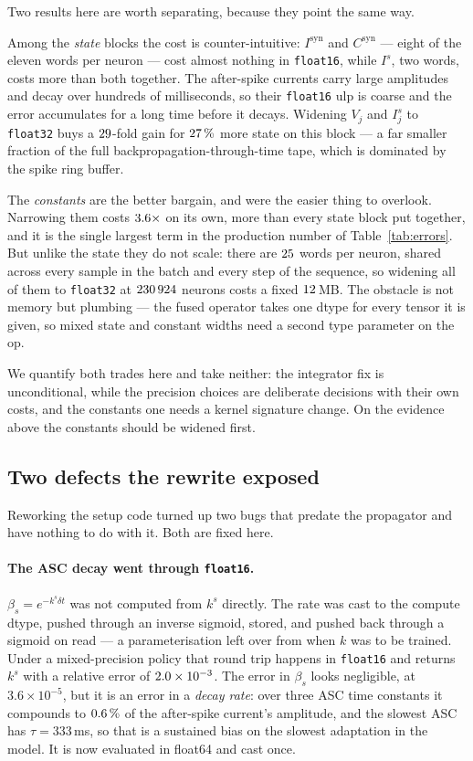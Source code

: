 \documentclass[11pt,a4paper,numbers=noenddot]{scrartcl}
\newcommand{\dt}{\delta t}
\newcommand{\Isyn}{I^{\mathrm{syn}}}
\newcommand{\Csyn}{C^{\mathrm{syn}}}
\newcommand{\code}[1]{\texttt{\small #1}}
\begin{document}
Two results here are worth separating, because they point the same way.

Among the \emph{state} blocks the cost is counter-intuitive: $\Isyn$ and
$\Csyn$ --- eight of the eleven words per neuron --- cost almost nothing in
\code{float16}, while $I^{s}$, two words, costs more than both together. The
after-spike currents carry large amplitudes and decay over hundreds of
milliseconds, so their \code{float16} ulp is coarse and the error accumulates
for a long time before it decays. Widening $V_j$ and $I^{s}_j$ to
\code{float32} buys a $29$-fold gain for $27\,\%$ more
state on this block --- a far smaller fraction of the full
backpropagation-through-time tape, which is dominated by the spike ring buffer.

The \emph{constants} are the better bargain, and were the easier thing to
overlook. Narrowing them costs $3.6\times$ on its own, more than
every state block put together, and it is the single largest term in the
production number of Table~\ref{tab:errors}. But unlike the state they do not
scale: there are $25$ words per neuron, shared across every sample
in the batch and every step of the sequence, so widening all of them to
\code{float32} at $230\,924$ neurons costs a fixed
$12\,$MB. The obstacle is not memory but plumbing --- the fused
operator takes one dtype for every tensor it is given, so mixed state and
constant widths need a second type parameter on the op.

We quantify both trades here and take neither: the integrator fix is
unconditional, while the precision choices are deliberate decisions with their
own costs, and the constants one needs a kernel signature change. On the
evidence above the constants should be widened first.

\subsection{Two defects the rewrite exposed}
\label{sec:defects}

Reworking the setup code turned up two bugs that predate the propagator and
have nothing to do with it. Both are fixed here.

\paragraph{The ASC decay went through \code{float16}.}
$\beta_s = e^{-k^{s}\dt}$ was not computed from $k^{s}$ directly. The rate was
cast to the compute dtype, pushed through an inverse sigmoid, stored, and
pushed back through a sigmoid on read --- a parameterisation left over from
when $k$ was to be trained. Under a mixed-precision policy that round trip
happens in \code{float16} and returns $k^{s}$ with a relative error of
$2.0\times 10^{-3}$. The error in $\beta_s$ looks negligible, at
$3.6\times10^{-5}$, but it is an error in a \emph{decay rate}: over three ASC
time constants it compounds to $0.6\,\%$ of the after-spike
current's amplitude, and the slowest ASC has $\tau = 333\,$ms, so that is a
sustained bias on the slowest adaptation in the model. It is now evaluated in
float64 and cast once.
\end{document}
